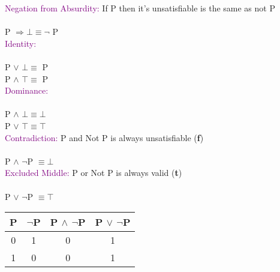 \documentclass[a4paper,10pt]{article}
\begin{document}
\indent \textcolor{Purple}{Negation from Absurdity:} If P then it's unsatisfiable is the same as not P\\ \\
\indent \indent P $\Rightarrow \bot \equiv \neg$ P \\

\indent \textcolor{Purple}{Identity:} \\ \\
\indent \indent P $\lor$ $\bot \equiv$ P \\
\indent \indent P $\land$ $\top \equiv$ P \\

\indent \textcolor{Purple}{Dominance:}\\ \\
\indent \indent P $\land$ $\bot \equiv \bot$  \\
\indent \indent P $\lor$ $\top \equiv \top$  \\

\indent \textcolor{Purple}{Contradiction:} P and Not P is always unsatisfiable (\textbf{f})\\ \\
\indent \indent P $\land$ $\neg$P $\equiv \bot$ \\ 

\indent \textcolor{Purple}{Excluded Middle:} P or Not P is always valid (\textbf{t})\\ \\
\indent \indent P $\lor$ $\neg$P $\equiv \top$ \\ 

\begin{tabular}{|c | c || c | c |}
\hline
 P & $\neg$P & P $\land$ $\neg$P & P $\lor$ $\neg$P\\
\hline 
0 & 1 & 0 & 1\\
\hline 
1 & 0 & 0 & 1\\
\hline
\end{tabular} \\ \\

\newpage 
\end{document}
